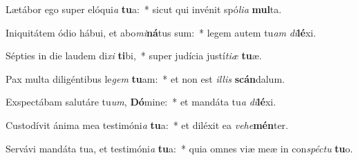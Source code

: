 \item Lætábor ego super elóqui\textit{a} \textbf{tu}a:~* sicut qui invénit spó\textit{li}\textit{a} \textbf{mul}ta.
\item Iniquitátem ódio hábui, et abo\textit{mi}\textbf{ná}tus sum:~* legem autem tu\textit{am} \textit{di}\textbf{lé}xi.
\item Sépties in die laudem di\textit{xi} \textbf{ti}bi,~* super judícia justí\textit{ti}\textit{æ} \textbf{tu}æ.
\item Pax multa diligéntibus le\textit{gem} \textbf{tu}am:~* et non est \textit{il}\textit{lis} \textbf{scán}dalum.
\item Exspectábam salutáre tu\textit{um}, \textbf{Dó}mine:~* et mandáta tu\textit{a} \textit{di}\textbf{lé}xi.
\item Custodívit ánima mea testimóni\textit{a} \textbf{tu}a:~* et diléxit ea \textit{ve}\textit{he}\textbf{mén}ter.
\item Servávi mandáta tua, et testimóni\textit{a} \textbf{tu}a:~* quia omnes viæ meæ in con\textit{spéc}\textit{tu} \textbf{tu}o.
